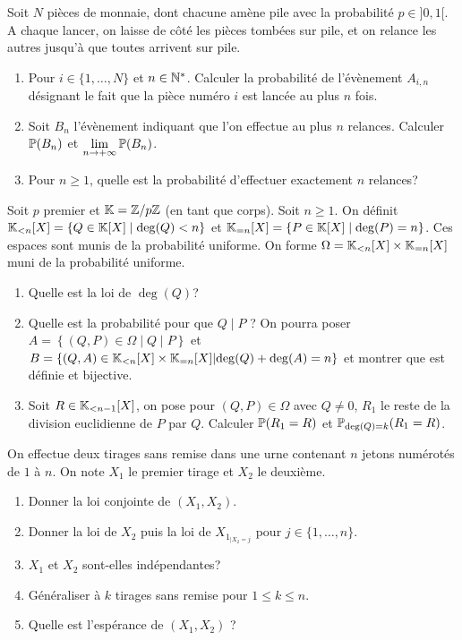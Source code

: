 \begin{exercise}
	Soit $N$ pièces de monnaie, dont chacune amène pile avec la probabilité
	$p\in]0,1[$. A chaque lancer, on laisse de côté les pièces tombées sur pile,
	et on relance les autres jusqu'à que toutes arrivent sur pile.
	\begin{enumerate}
		\item
		Pour $i\in\{1,\dots,N\}$ et $n\in\N^{*}$. Calculer la probabilité de
		l'évènement $A_{i,n}$ désignant le fait que la pièce numéro $i$ est lancée
		au plus $n$ fois.
		\item
		Soit $B_{n}$ l'évènement indiquant que l'on effectue au plus $n$ relances.
		Calculer $\P(B_{n})$ et $\lim\limits_{n\to+\infty}\P(B_{n})$.
		\item
		Pour $n\geqslant1$, quelle est la probabilité d'effectuer exactement $n$
		relances?
	\end{enumerate}
\end{exercise}

\begin{exercise}
	Soit $p$ premier et $\K=\Z/p\Z$ (en tant que corps). Soit $n\geqslant1$. On
	définit $\K_{<n}[X]=\{Q\in\K[X]\mid \deg(Q)<n\}$ et
	$\K_{=n}[X]=\{P\in\K[X]\mid \deg(P)=n\}$. Ces espaces sont munis de la
	probabilité uniforme. On forme $\Omega=\K_{<n}[X]\times\K_{=n}[X]$ muni de la
	probabilité uniforme.
	\begin{enumerate}
		\item
		Quelle est la loi de $\deg(Q)$?
		\item
		Quelle est la probabilité pour que $Q\mid P$ ? On pourra poser $A=\left\lbrace(Q,P)\in\Omega\middle| Q\mid P\right\rbrace$ et $B=\left\lbrace(Q,A)\in\K_{<n}[X]\times\K_{=n}[X]\middle|\deg(Q)+\deg(A)=n\right\rbrace$ et montrer que  est définie et bijective.
		\item
		Soit $R\in\K_{<n-1}[X]$, on pose pour $(Q,P)\in\Omega$ avec $Q\neq0$,
		$R_{1}$ le reste de la division euclidienne de $P$ par $Q$. Calculer
		$\P(R_{1}=R)$ et $\P_{\deg(Q)=k}(R_{1}=R)$.
	\end{enumerate}
\end{exercise}

\begin{exercise}
	On effectue deux tirages sans remise dans une urne contenant $n$ jetons
	numérotés de $1$ à $n$. On note $X_{1}$ le premier tirage et $X_{2}$ le
	deuxième.
	\begin{enumerate}
		\item
		Donner la loi conjointe de $(X_{1},X_{2})$.
		\item
		Donner la loi de $X_{2}$ puis la loi de $X_{{1}_{\mid X_{2}=j}}$ pour
		$j\in\{1,\dots,n\}$.
		\item
		$X_{1}$ et $X_{2}$ sont-elles indépendantes?
		\item
		Généraliser à $k$ tirages sans remise pour $1\leqslant k\leqslant n$.
		\item Quelle est l'espérance de $(X_{1},X_{2})$ ?
	\end{enumerate}
\end{exercise}